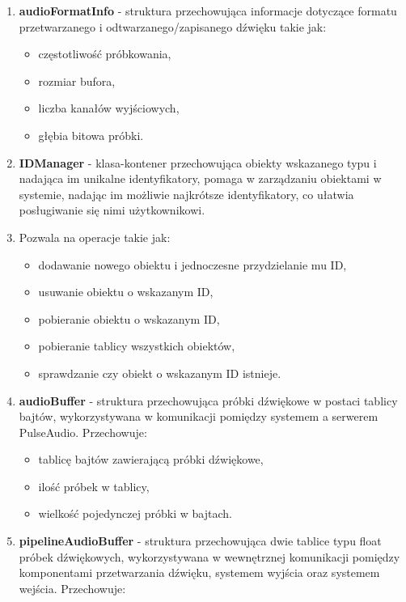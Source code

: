 \begin{enumerate}
    \item \textbf{audioFormatInfo} - struktura przechowująca informacje dotyczące formatu przetwarzanego i odtwarzanego/zapisanego dźwięku takie jak:
    \begin{itemize}
        \item częstotliwość próbkowania,
        \item rozmiar bufora,
        \item liczba kanałów wyjściowych,
        \item głębia bitowa próbki.
    \end{itemize}
    \item \textbf{IDManager} - klasa-kontener przechowująca obiekty wskazanego typu i nadająca im unikalne identyfikatory, pomaga w zarządzaniu obiektami w systemie, nadając im możliwie najkrótsze identyfikatory, co ułatwia posługiwanie się nimi użytkownikowi.
    \item Pozwala na operacje takie jak:
    \begin{itemize}
        \item dodawanie nowego obiektu i jednoczesne przydzielanie mu ID,
        \item usuwanie obiektu o wskazanym ID,
        \item pobieranie obiektu o wskazanym ID,
        \item pobieranie tablicy wszystkich obiektów,
        \item sprawdzanie czy obiekt o wskazanym ID istnieje.
    \end{itemize}
    \item \textbf{audioBuffer} - struktura przechowująca próbki dźwiękowe w postaci tablicy bajtów, wykorzystywana w komunikacji pomiędzy systemem a serwerem PulseAudio. Przechowuje:
    \begin{itemize}
        \item tablicę bajtów zawierającą próbki dźwiękowe,
        \item ilość próbek w tablicy,
        \item wielkość pojedynczej próbki w bajtach.
    \end{itemize}
    \item \textbf{pipelineAudioBuffer} - struktura przechowująca dwie tablice typu float próbek dźwiękowych, wykorzystywana w wewnętrznej komunikacji pomiędzy komponentami przetwarzania dźwięku, systemem wyjścia oraz systemem wejścia. Przechowuje:
    \begin{itemize}

\end{itemize}
\end{enumerate}
